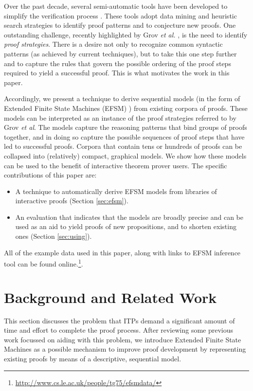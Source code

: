 \documentclass{llncs}
\begin{document}
Over the past decade, several semi-automatic tools have been developed to simplify the verification process \cite{ML4PG13,Duncan07,Dixon03,Grov13}. These tools adopt data mining and heuristic search strategies to identify proof patterns and to conjecture new proofs. One outstanding challenge, recently highlighted by Grov \emph{et al.} \cite{Grov12}, is the need to identify \emph{proof strategies}. There is a desire not only to recognize common syntactic patterns (as achieved by current techniques), but to take this one step further and to capture the rules that govern the possible ordering of the proof steps required to yield a successful proof. This is what motivates the work in this paper.

Accordingly, we present a technique to derive sequential models (in the form of Extended Finite State Machines (EFSM) \cite{Walkinshaw13}) from existing corpora of proofs. These models can be interpreted as an instance of the proof strategies referred to by Grov \emph{et al}. The models capture the reasoning patterns that bind groups of proofs together, and in doing so capture the possible sequences of proof steps that have led to successful proofs. Corpora that contain tens or hundreds of proofs can be collapsed into (relatively) compact, graphical models. We show how these models can be used to the benefit of interactive theorem prover users. The specific contributions of this paper are:
\begin{itemize}
\item{A technique to automatically derive EFSM models from libraries of interactive proofs (Section \ref{sec:efsm}).}
\item{An evaluation that indicates that the models are broadly precise and can be used as an aid to yield proofs of new propositions, and to shorten existing ones (Section \ref{sec:using}).}
\end{itemize}

All of the example data used in this paper, along with links to EFSM inference tool can be found online.\footnote{\label{url}\url{http://www.cs.le.ac.uk/people/tg75/efsmdata/}}. 

\section{Background and Related Work}
This section discusses the problem that ITPs demand a significant amount of time and effort to complete the proof process. After reviewing some previous work focussed on aiding with this problem, we introduce Extended Finite State Machines as a possible mechanism to improve proof development by representing existing proofs by means of a descriptive, sequential model.
\label{sec:background}
\end{document}
